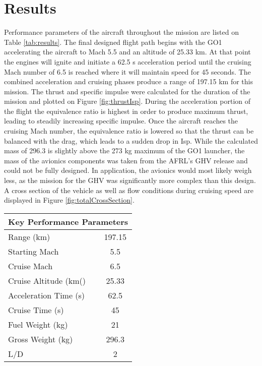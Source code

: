 \section{Results}

 Performance parameters of the aircraft throughout the mission are listed on Table \ref{tab:results}. The final designed flight path begins with the GO1 accelerating the aircraft to Mach 5.5 and an altitude of 25.33 km. At that point the engines will ignite and initiate a 62.5 s acceleration period until the cruising Mach number of 6.5 is reached where it will maintain speed for 45 seconds. The combined acceleration and cruising phases produce a range of 197.15 km for this mission. The thrust and specific impulse were calculated for the duration of the mission and plotted on Figure \ref{fig:thrustIsp}. During the acceleration portion of the flight the equivalence ratio is highest in order to produce maximum thrust, leading to steadily increasing specific impulse. Once the aircraft reaches the cruising Mach number, the equivalence ratio is lowered so that the thrust can be balanced with the drag, which leads to a sudden drop in Isp. While the calculated mass of 296.3 is slightly above the 273 kg maximum of the GO1 launcher, the mass of the avionics components was taken from the AFRL's GHV release \cite{ghv} and could not be fully designed. In application, the avionics would most likely weigh less, as the mission for the GHV was significantly more complex than this design. A cross section of the vehicle as well as flow conditions during cruising speed are displayed in Figure \ref{fig:totalCrossSection}.

\begin{center}
\begin{tabular}{l c}
\multicolumn{2}{c}{\textbf{Key Performance Parameters}} \\
\hline
Range (km) & 197.15 \\
Starting Mach & 5.5 \\
Cruise Mach & 6.5 \\
Cruise Altitude (km()& 25.33 \\
Acceleration Time (s) & 62.5 \\
Cruise Time (s) & 45 \\
Fuel Weight (kg) & 21 \\
Gross Weight (kg) & 296.3 \\
L/D & 2
\end{tabular}
\label{tab:results}
\end{center}


